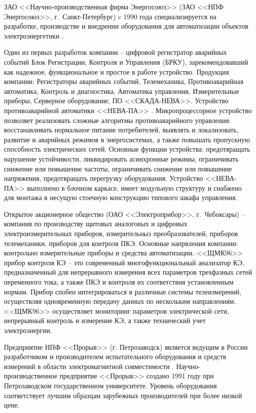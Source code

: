 ЗАО <<Научно-производственная фирма Энергосоюз>> (ЗАО <<НПФ Энергосоюз>>, г.~Санкт-Петербург)  c 1990 года специализируется на разработке, производстве и внедрении оборудования для автоматизации объектов электроэнергетики \cite{энергосоюз}.

Один из первых разработок компании – цифровой регистратор аварийных событий Блок Регистрации, Контроля и Управления (БРКУ), зарекомендовавший как надежное, функциональное и простое в работе устройство. Продукция компании: Регистраторы аварийных событий, Телемеханика, Противоаварийная автоматика, Контроль и диагностика, Автоматика управления, Измерительные приборы, Серверное оборудование, ПО <<СКАДА-НЕВА>>.
Устройство противоаварийной автоматики <<НЕВА-ПА>> \cite{нева-па}. 
Микропроцессорное устройство позволяет реализовать сложные алгоритмы противоаварийного управления: восстанавливать нормальное питание потребителей, выявлять и локализовать, развитие и аварийных режимов в энергосистемах, а также повышать пропускную способность электрических сетей. Основные функции устройства: предотвращать нарушение устойчивости, ликвидировать асинхронные режимы, ограничивать снижение или повышение частоты, ограничивать снижение или повышение напряжения, предотвращать перегрузку оборудования. Устройство <<НЕВА-ПА>> выполнено в блочном каркасе, имеет модульную структуру и снабжено для монтажа в несущую стоечную конструкцию типового шкафа управления.

Открытое акционерное общество (ОАО <<Электроприбор>>, г.~Чебоксары) – компания по производству щитовых аналоговых и цифровых электроизмерительных приборов, измерительныз преобразователей, приборов телемеханики, приборов для контроля ПКЭ. Основные напрвления компании: контрольно измерительные приборы и средства автоматизации.
<<ЩМК96>> прибор контроля КЭ – это современный многофункциональный анализатор КЭ, предназначенный для непрерывного измерения всех параметров трехфазных сетей переменного тока, а также ПКЭ и контроля их соответствия установленным нормам. Прибор спобен интегрироваться в различные системы телеизмерений, осуществляя одновременную передачу данных по нескольким направлениям. <<ЩМК96>> осуществляет мониторинг параметров электрической сети, непрерывный контроль и измерение КЭ, а также технический учет электроэнергии.

Предприятие НПФ <<Прорыв>> (г. Петрозаводск) является ведущим в России разработчиком и производителем испытательного оборудования и средств измерений в области электромагнитной совместимости \cite{прорыв}. 
Научно-производственное предприятие <<Прорыв>> создано 1991 году при Петрозаводском государственном университете. Уровень оборудования соответствует лучшим образцам зарубежных производителей при более низкой цене.

